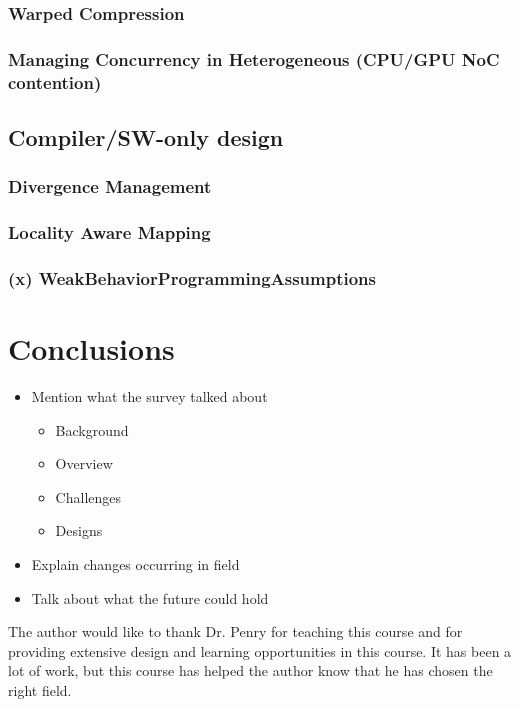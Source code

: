 \documentclass[prodmode,acmtecs]{acmsmall} %
\begin{document}
\subsubsection{Warped Compression}
\subsubsection{Managing Concurrency in Heterogeneous (CPU/GPU NoC contention)}
\subsection{Compiler/SW-only design}
\subsubsection{Divergence Management}
\subsubsection{Locality Aware Mapping}
\subsubsection{(x) WeakBehaviorProgrammingAssumptions}

\section{Conclusions} \label{sec:conclusions}
\begin{itemize}
\item Mention what the survey talked about
  \begin{itemize}
  \item Background
  \item Overview
  \item Challenges
  \item Designs
  \end{itemize}
\item Explain changes occurring in field
\item Talk about what the future could hold
\end{itemize}

\begin{acks}
The author would like to thank Dr. Penry for teaching this course and for
providing extensive design and learning opportunities in this course. It has
been a lot of work, but this course has helped the author know that he has
chosen the right field.
\end{acks}




\end{document}
